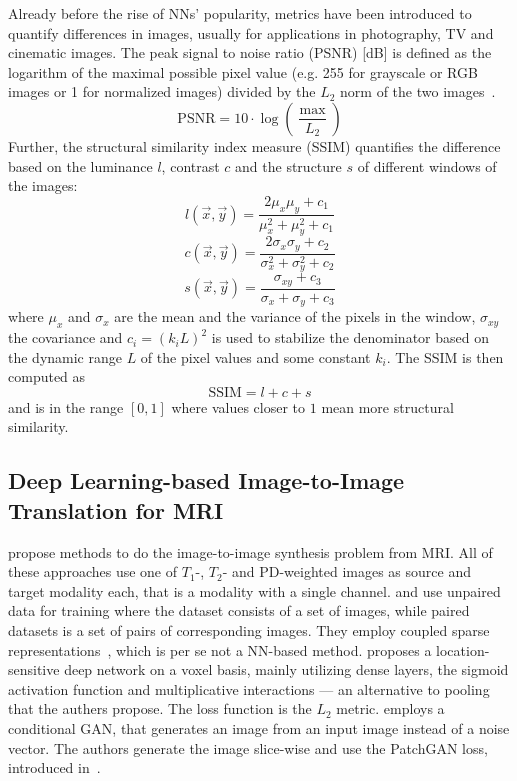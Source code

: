 Already before the rise of NNs' popularity, metrics have been introduced to quantify differences in images, usually for applications in photography, TV and cinematic images.
The peak signal to noise ratio (PSNR) [dB] is defined as the logarithm of the maximal possible pixel value (e.g. 255 for grayscale or RGB images or 1 for normalized images) divided by the $L_2$ norm of the two images~\autocite{rao_transform_2018}.
\[ \text{PSNR} = 10 \cdot \log \left( \frac{\max}{L_2} \right) \]
Further, the structural similarity index measure (SSIM) quantifies the difference based on the luminance $l$, contrast $c$ and the structure $s$ of different windows of the images:
\[ l(\overrightarrow{x}, \overrightarrow{y}) = \frac{2 \mu_x \mu_y + c_1}{\mu_x^2 + \mu_y^2 + c_1} \]
\[ c(\overrightarrow{x}, \overrightarrow{y}) = \frac{2 \sigma_x \sigma_y + c_2}{\sigma_x^2 + \sigma_y^2 + c_2} \]
\[ s(\overrightarrow{x}, \overrightarrow{y}) = \frac{\sigma_{xy} + c_3}{\sigma_x + \sigma_y + c_3} \]
where $\mu_x$ and $\sigma_x$ are the mean and the variance of the pixels in the window, $\sigma_{xy}$ the covariance and $c_i = (k_i L)^2$ is used to stabilize the denominator based on the dynamic range $L$ of the pixel values and some constant $k_i$.
The SSIM is then computed as
\[ \text{SSIM} = l + c + s \]
and is in the range $[0, 1]$ where values closer to $1$ mean more structural similarity.


\subsection{Deep Learning-based Image-to-Image Translation for MRI}
\autocite{van_nguyen_cross-domain_2015, huang_simultaneous_2017, vemulapalli_unsupervised_2015, yang_mri_2020} propose methods to do the image-to-image synthesis problem from MRI.
All of these approaches use one of $T_1$-, $T_2$- and PD-weighted images as source and target modality each, that is a modality with a single channel.
\autocite{vemulapalli_unsupervised_2015} and \autocite{huang_simultaneous_2017} use unpaired data for training where the dataset consists of a set of images, while paired datasets is a set of pairs of corresponding images.
They employ coupled sparse representations~\autocite{hutchison_robust_2013}, which is per se not a NN-based method.
\autocite{van_nguyen_cross-domain_2015} proposes a location-sensitive deep network on a voxel basis, mainly utilizing dense layers, the sigmoid activation function and multiplicative interactions --- an alternative to pooling that the authers propose.
The loss function is the $L_2$ metric.
\autocite{yang_mri_2020} employs a conditional GAN, that generates an image from an input image instead of a noise vector. The authors generate the image slice-wise and use the PatchGAN loss, introduced in~\autocite{isola_image-image_2017}. \\

